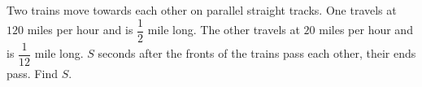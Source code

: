 Two trains move towards each other on parallel straight tracks. One travels at $120$ miles per hour and is $\dfrac{1}{2}$ mile long. The other travels at $20$ miles per hour and is $\dfrac{1}{12}$ mile long. $S$ seconds after the fronts of the trains pass each other, their ends pass. Find $S$.
